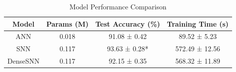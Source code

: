 \begin{table}[!t]
\centering
\caption{Model Performance Comparison}
\label{tab:performance}
\begin{tabular}{c c c c}
\toprule
Model & Params (M) & Test Accuracy (\%) & Training Time (s) \\
\midrule
ANN & 0.018 & 91.08 ± 0.42 & 89.52 ± 5.23 \\
SNN & 0.117 & 93.63 ± 0.28* & 572.49 ± 12.56 \\
DenseSNN & 0.117 & 92.15 ± 0.35 & 568.32 ± 11.89 \\
\bottomrule
\end{tabular}
\end{table}